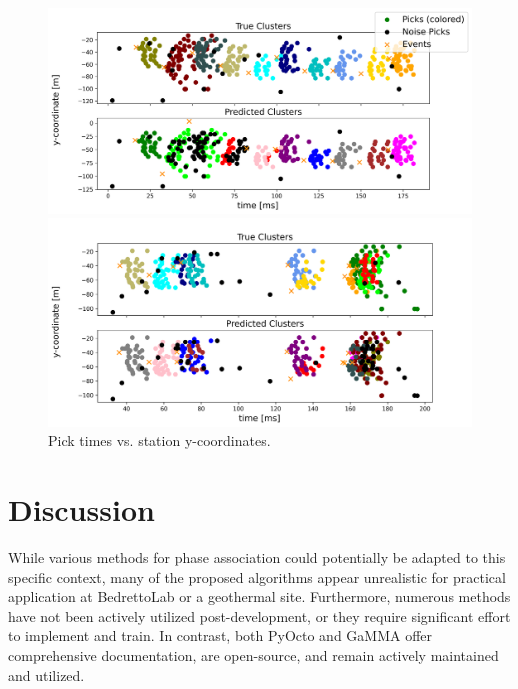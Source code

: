 \documentclass{scrreprt}
\begin{document}
\begin{figure}
    \centering
    \begin{minipage}{1\textwidth}  %
        \centering
        \includegraphics[width=\textwidth, height=0.35\textheight, keepaspectratio]{plots/clustering_full_regular.png}  %
    \end{minipage}
    \vfill
    \begin{minipage}{1\textwidth}  %
        \centering
        \includegraphics[width=\textwidth, height=0.352\textheight, keepaspectratio]{plots/clustering_full_irregular.png}  %
    \end{minipage}
    \vfill
    \parbox{0.8\textwidth}{  %
    \caption{\label{fig:clusterings}Pick times vs. station y-coordinates.}
    }
\end{figure}


\chapter{Discussion}
While various methods for phase association could potentially be adapted to this specific context, many of the proposed algorithms appear unrealistic for practical application at BedrettoLab or a geothermal site. Furthermore, numerous methods have not been actively utilized post-development, or they require significant effort to implement and train. In contrast, both PyOcto and GaMMA offer comprehensive documentation, are open-source, and remain actively maintained and utilized.
\end{document}
